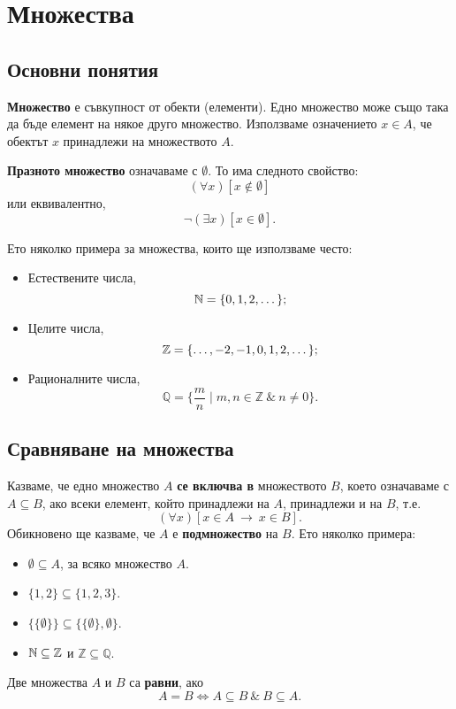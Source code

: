 \chapter{Множества}

\section{Основни понятия}
{\bf Множество} е съвкупност от обекти (елементи).
Едно множество може също така да бъде елемент на някое друго множество.
Използваме означението $x \in A$, 
че обектът $x$ принадлежи на множеството $A$.

{\bf Празното множество} означаваме с $\emptyset$.
То има следното свойство:
\[(\forall x)[x \not \in \emptyset]\]
или еквивалентно,
\[\neg (\exists x)[x \in \emptyset].\]

\begin{example}
  Ето няколко примера за множества, които ще използваме често:
  \begin{itemize}
  \item 
    Естествените числа, 
    \[\mathbb{N} = \{0,1,2,\dots\};\]
  \item
    Целите числа,
    \[\mathbb{Z} = \{\dots,-2,-1,0,1,2,\dots\};\]
  \item
    Рационалните числа,
    \[\mathbb{Q} = \{\frac{m}{n} \mid m,n \in \mathbb{Z}\ \&\ n \neq 0\}.\]
  \end{itemize}
\end{example}


\section{Сравняване на множества}

Казваме, че едно множество $A$ {\bf се включва в} множеството $B$, което означаваме с $A \subseteq B$, 
ако всеки елемент, който принадлежи на $A$, принадлежи и на $B$, т.е.
\[(\forall x)[x \in A\ \rightarrow\ x \in B].\]
Обикновено ще казваме, че $A$ е {\bf подмножество} на $B$.
Ето няколко примера:
\begin{itemize}
\item 
  $\emptyset \subseteq A$, за всяко множество $A$.
\item
  $\{1,2\} \subseteq \{1,2,3\}$.
\item
  $\{\{\emptyset\}\} \subseteq \{\{\emptyset\},\emptyset\}$.
\item
  $\mathbb{N} \subseteq \mathbb{Z}$ и $\mathbb{Z} \subseteq \mathbb{Q}$.
\end{itemize}
Две множества $A$ и $B$ са {\bf равни}, ако
\[A = B \iff A \subseteq B\ \&\ B\subseteq A.\]

